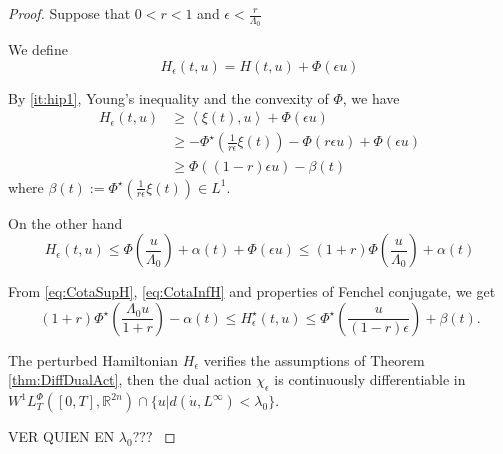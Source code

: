 \documentclass[twoside]{article}
\theoremstyle{remark}
\newcommand{\lphi}{L^{\Phi}}
\newcommand{\wphit}{W^{1}\lphi_T}
\newcommand{\rr}{\mathbb{R}}
\renewcommand{\leq}{\leqslant}
\renewcommand{\geq}{\geqslant}
\begin{document}
\begin{proof} 

Suppose that $0<r<1$ and $\epsilon<\frac{r}{\Lambda_0}$

We define
\[
  H_{\epsilon}(t,u)=H(t,u)+\Phi(\epsilon u)
\]
 

By \ref{it:hip1}, Young's inequality and the convexity of $\Phi$, we have
\begin{equation}\label{eq:CotaSupH}
 \begin{split}
    H_{\epsilon}(t,u)  &\geq \left\langle \xi(t), u \right\rangle +\Phi(\epsilon u)
		\\
				&\geq -\Phi^{\star}\left(\frac{1}{r\epsilon} \xi(t)\right)-\Phi(r\epsilon u)+\Phi(\epsilon u)
		\\
		    &\geq  \Phi((1-r)\epsilon u)-\beta(t)
				  \end{split} 
\end{equation}
where $\beta(t):=\Phi^{\star}( \frac{1}{r\epsilon} \xi(t))\in L^1$. 

On the other hand
\begin{equation}\label{eq:CotaInfH}
  H_{\epsilon}(t,u)  \leq  \Phi\left(\frac{u}{\Lambda_0}\right)+\alpha(t)+\Phi(\epsilon u)\leq 
	(1+r)\Phi\left(\frac{u}{\Lambda_0}\right)+\alpha(t)
\end{equation}


From  \eqref{eq:CotaSupH}, \eqref{eq:CotaInfH} and  properties of Fenchel conjugate, we get
\begin{equation}\label{eq:CotaH*}
(1+r)\Phi^{\star}\left(\frac{\Lambda_0 u}{1+r}\right)-\alpha(t)\leq H^{\star}_{\epsilon}(t,u)\leq \Phi^{\star}\left(\frac{u}{(1-r)\epsilon}\right)+\beta(t).
\end{equation}

The perturbed Hamiltonian $H_{\epsilon}$ verifies the assumptions of Theorem \ref{thm:DiffDualAct}, 
then the dual action $\chi_{\epsilon}$
is continuously differentiable in $\wphit([0,T],\rr^{2n}) \cap \{u|d(\dot{u},L^{\infty})<\lambda_0\}$.

\textcolor[rgb]{1,0,0}{VER QUIEN EN $\lambda_0???$
}


\end{proof}
\end{document}
